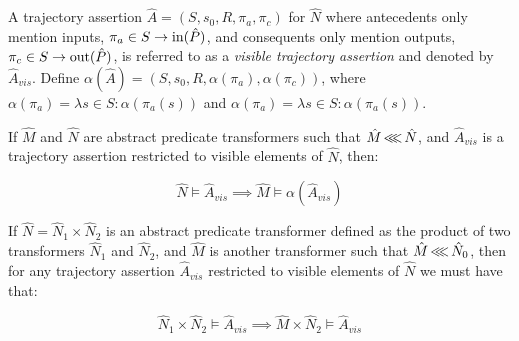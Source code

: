 
A trajectory assertion $\hat A = (S, s_{0}, R, \pi_{a}, \pi_{c})$ for $\hat N$ where antecedents only mention inputs, $\pi_{a} \in S \rightarrow \operatorname{in}(\hat P)$, and consequents only mention outputs, $\pi_{c} \in S \rightarrow \operatorname{out}(\hat P)$, is referred to as a \textit{visible trajectory assertion} and denoted by $\hat A_{vis}$. Define $\alpha(\hat A) = (S, s_{0}, R, \alpha(\pi_{a}), \alpha(\pi_{c}))$, where $\alpha(\pi_{a}) = \lambda s \in S : \alpha(\pi_{a}(s))$ and $\alpha(\pi_{a}) = \lambda s \in S : \alpha(\pi_{a}(s))$.



\begin{theorem}
\label{thm:refinement}
If $\hat M$ and $\hat N$ are abstract predicate transformers such that $\hat M \operatorname{\lll} \hat N$, and $\hat A_{vis}$ is a trajectory assertion restricted to visible elements of $\hat N$, then:

\begin{equation*}
\hat N \models \hat A_{vis} \implies \hat M \models \alpha(\hat A_{vis})
\end{equation*}
\end{theorem}

\begin{corollary}
\label{thm:refinement-product}
If $\hat N = \hat N_{1} \times \hat N_{2}$ is an abstract predicate transformer defined as the product of two transformers $\hat N_{1}$ and $\hat N_{2}$, and $\hat M$ is another transformer such that $\hat M \operatorname{\lll} \hat N_{0}$, then for any trajectory assertion $\hat A_{vis}$ restricted to visible elements of $\hat N$ we must have that:

\begin{equation*}
\hat N_{1} \times \hat N_{2} \models \hat A_{vis} \implies \hat M \times \hat N_{2} \models \hat A_{vis}
\end{equation*}
\end{corollary}



